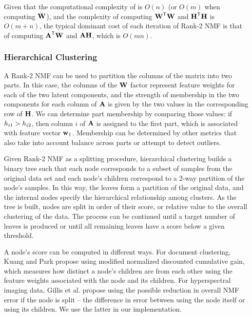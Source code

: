 \documentclass[conference,compsoc]{IEEEtran}
\begin{document}
Given that the computational complexity of  is $O(n)$ (or $O(m)$ when computing $\M{W}$), and the complexity of computing $\M{W}^\Tra\M{W}$ and $\M{H}^\Tra\M{H}$ is $O(m+n)$, the typical dominant cost of each iteration of Rank-2 NMF is that of computing $\M{A}^\Tra\M{W}$ and $\M{A}\M{H}$, which is $O(mn)$.

\subsubsection{Hierarchical Clustering}

A Rank-2 NMF can be used to partition the columns of the matrix into two parts.
In this case, the columns of the $\M{W}$ factor represent feature weights for each of the two latent components, and the strength of membership in the two components for each column of $\M{A}$ is given by the two values in the corresponding row of $\M{H}$.
We can determine part membership by comparing those values: if $\ME{H}{i1} > \ME{H}{i2}$, then column $i$ of $\M{A}$ is assigned to the first part, which is associated with feature vector $\V{w}_1$.
Membership can be determined by other metrics that also take into account balance across parts or attempt to detect outliers.

Given Rank-2 NMF as a splitting procedure, hierarchical clustering builds a binary tree such that each node corresponds to a subset of samples from the original data set and each node's children correspond to a 2-way partition of the node's samples.
In this way, the leaves form a partition of the original data, and the internal nodes specify the hierarchical relationship among clusters.
As the tree is built, nodes are split in order of their score, or relative value to the overall clustering of the data.
The process can be continued until a target number of leaves is produced or until all remaining leaves have a score below a given threshold.

A node's score can be computed in different ways.
For document clustering, Kuang and Park \cite{KP13} propose using modified normalized discounted cumulative gain, which measures how distinct a node's children are from each other using the feature weights associated with the node and its children.
For hyperspectral imaging data, Gillis et al. \cite{GKP15} propose using the possible reduction in overall NMF error if the node is split -- the difference in error between using the node itself or using its children.
We use the latter in our implementation.
\end{document}

